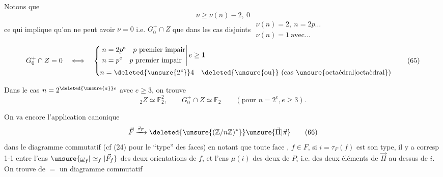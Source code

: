 Notons que
\[
\nu\ge\nu(n)-2,\ 0
\]
ce qui implique qu'on ne peut avoir $\nu=0$ i.e. $G_0^+\cap Z$ que dans les cas disjoints \(\substack{\nu(n)=2,\ n=2p\ldots\\\nu(n)=1\ \text{avec}\ldots}\)
\[
G_0^+\cap Z=0\quad\Longleftrightarrow\quad
\left\{\begin{aligned}
&\left.\begin{aligned}
 n&=2p^e\quad p\text{ premier impair}\\
 n&=p^e\quad p\text{ premier impair}
 \end{aligned}\right|e\ge1\\
&n=\deleted{\unsure{2^e}}4\quad\deleted{\text{\unsure{ou}}}\ (\text{cas \unsure{octaédral|octaèdral}})
\end{aligned}\right.
\tag*{(65)}
\]

Dans le cas $n=2^{\deleted{\unsure{a}}e}$ avec $e\ge3$, on trouve 
\[
 {}_2Z\simeq\mathbb F_2^2,\qquad G_0^+\cap Z\simeq\mathbb F_2
 \qquad(\text{pour }n=2^e,e\ge3).
\tag*{(65)}
\]

On va encore  l'application canonique
\[
\vec F\xrightarrow{\vec\tau_F}\deleted{\unsure{(\mathbb Z/n\mathbb Z)^*}}\unsure{\vec\Pi|\vec\pi}
\tag*{(66)}
\]
 dans le diagramme commutatif 
(cf (24) pour le ``type'' des faces)
en notant que toute face  , $f\in F$, si $i=\tau_F(f)$ est son type, il y a corresp 1-1 entre l'ens $\unsure{\underline\omega_f|\simeq_f|\vec F_f}$ des deux orientations de $f$, et l'ens $\mu(i)$ des deux  de $P_i$ i.e. des deux éléments de $\vec\Pi$ au dessus de $i$. On trouve de $=$ un diagramme commutatif 
